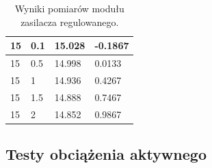 \begin{table}[]
\begin{tabular}{|l|l|l|l|}
15                         & 0.1                    & 15.028                     & -0.1867                \\ \hline
15                         & 0.5                    & 14.998                     & 0.0133                 \\ \hline
15                         & 1                      & 14.936                     & 0.4267                 \\ \hline
15                         & 1.5                    & 14.888                     & 0.7467                 \\ \hline
15                         & 2                      & 14.852                     & 0.9867                 \\ \hline
\end{tabular}
\caption{Wyniki pomiarów modułu zasilacza regulowanego.}
\label{tab:pomiaryZasilacza}
\end{table}


\subsection{Testy obciążenia aktywnego}

